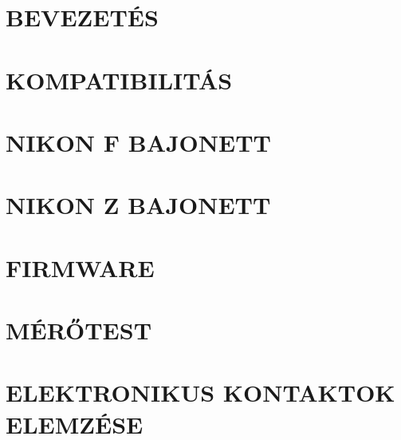 








%


%



\newpage
\tableofcontents
\newpage





\clearpage
\section{BEVEZETÉS}

\clearpage
\section{KOMPATIBILITÁS}

\clearpage
\section{NIKON F BAJONETT}

\clearpage
\section{NIKON Z BAJONETT}

\clearpage
\section{FIRMWARE}

\clearpage
\section{MÉRŐTEST}

\clearpage
\section{ELEKTRONIKUS KONTAKTOK ELEMZÉSE}

\clearpage
